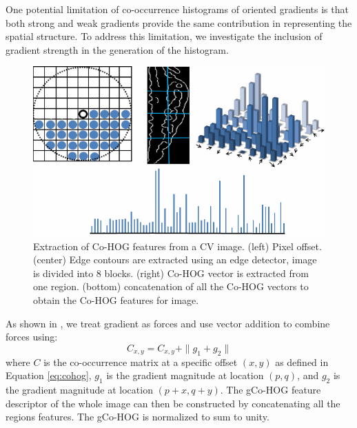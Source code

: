 One potential limitation of co-occurrence histograms of oriented gradients is that both strong and weak gradients provide the same contribution in representing the spatial structure.  To address this limitation, we investigate the inclusion of gradient strength in the generation of the histogram.
\begin{figure}[htb] 
 \centering
\includegraphics[scale=0.35]{figure/cohog.png}
  \caption{ Extraction of Co-HOG features from a CV image. (left) Pixel offset. (center) Edge contours are extracted using an edge detector, image is divided into 8 blocks. (right) Co-HOG vector is extracted from one region. (bottom) concatenation of all the Co-HOG vectors to obtain the Co-HOG features for image.}
 \label{cohog}
\end{figure}
As shown in \cite{Pang12}, we treat gradient as forces and use vector addition to combine forces using:
				\small
				\begin{equation}\label{eq:add}
				C_{x,y} = C_{x,y} + \|g_{1} + g_{2}\| 
				\end{equation}
				\normalsize 
where $C$ is the co-occurrence matrix at a specific offset $(x, y)$ as defined in Equation \ref{eq:cohog}, $g_{1}$ is the gradient magnitude at location $(p, q)$, and $g_{2}$ is the gradient magnitude at location $(p + x, q + y)$. The gCo-HOG feature descriptor of the whole image can then be constructed by concatenating all the regions features. The gCo-HOG is normalized to sum to unity.
